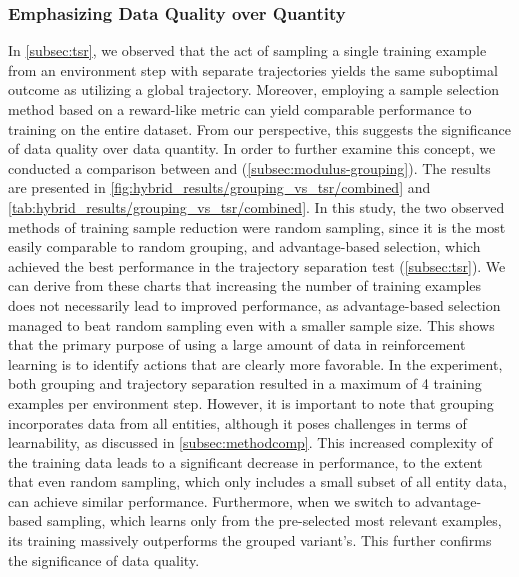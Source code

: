 \subsubsection{Emphasizing Data Quality over Quantity}
\noindent In \autoref{subsec:tsr}, we observed that the act of sampling a single training example from an environment step with separate trajectories yields the same suboptimal outcome as utilizing a global trajectory. Moreover, employing a sample selection method based on a reward-like metric can yield comparable performance to training on the entire dataset. From our perspective, this suggests the significance of data quality over data quantity. In order to further examine this concept, we conducted a comparison between  and  (\autoref{subsec:modulus-grouping}). The results are presented in \autoref{fig:hybrid_results/grouping_vs_tsr/combined} and \autoref{tab:hybrid_results/grouping_vs_tsr/combined}. In this study, the two observed methods of training sample reduction were random sampling, since it is the most easily comparable to random grouping, and advantage-based selection, which achieved the best performance in the trajectory separation test (\autoref{subsec:tsr}). We can derive from these charts that increasing the number of training examples does not necessarily lead to improved performance, as advantage-based selection managed to beat random sampling even with a smaller sample size. This shows that the primary purpose of using a large amount of data in reinforcement learning is to identify actions that are clearly more favorable. In the experiment, both grouping and trajectory separation resulted in a maximum of 4 training examples per environment step. However, it is important to note that grouping incorporates data from all entities, although it poses challenges in terms of learnability, as discussed in \autoref{subsec:methodcomp}. This increased complexity of the training data leads to a significant decrease in performance, to the extent that even random sampling, which only includes a small subset of all entity data, can achieve similar performance. Furthermore, when we switch to advantage-based sampling, which learns only from the pre-selected most relevant examples, its training massively outperforms the grouped variant's. This further confirms the significance of data quality.

